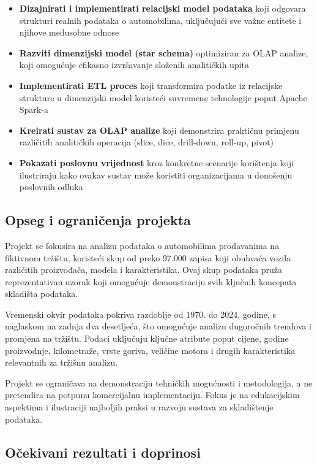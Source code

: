 \begin{itemize}
    \item \textbf{Dizajnirati i implementirati relacijski model podataka} koji odgovara strukturi realnih podataka o automobilima, uključujući sve važne entitete i njihove međusobne odnose
    \item \textbf{Razviti dimenzijski model (star schema)} optimiziran za OLAP analize, koji omogućuje efikasno izvršavanje složenih analitičkih upita
    \item \textbf{Implementirati ETL proces} koji transformira podatke iz relacijske strukture u dimenzijski model koristeći suvremene tehnologije poput Apache Spark-a
    \item \textbf{Kreirati sustav za OLAP analize} koji demonstrira praktičnu primjenu različitih analitičkih operacija (slice, dice, drill-down, roll-up, pivot)
    \item \textbf{Pokazati poslovnu vrijednost} kroz konkretne scenarije korištenja koji ilustriraju kako ovakav sustav može koristiti organizacijama u donošenju poslovnih odluka
\end{itemize}

\subsection{Opseg i ograničenja projekta}

Projekt se fokusira na analizu podataka o automobilima prodavanima na fiktivnom tržištu, koristeći skup od preko 97.000 zapisa koji obuhvaća vozila različitih proizvođača, modela i karakteristika. Ovaj skup podataka pruža reprezentativan uzorak koji omogućuje demonstraciju svih ključnih koncepata skladišta podataka.

Vremenski okvir podataka pokriva razdoblje od 1970. do 2024. godine, s naglaskom na zadnja dva desetljeća, što omogućuje analizu dugoročnih trendova i promjena na tržištu. Podaci uključuju ključne atribute poput cijene, godine proizvodnje, kilometraže, vrste goriva, veličine motora i drugih karakteristika relevantnih za tržišnu analizu.

Projekt se ograničava na demonstraciju tehničkih mogućnosti i metodologija, a ne pretendira na potpunu komercijalnu implementaciju. Fokus je na edukacijskim aspektima i ilustraciji najboljih praksi u razvoju sustava za skladištenje podataka.

\subsection{Očekivani rezultati i doprinosi}

